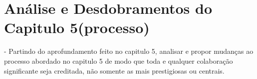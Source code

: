 \chapter{ Análise e Desdobramentos do Capitulo 5(processo)}\label{cap:cap6}

- Partindo do aprofundamento feito no capitulo 5, analisar e propor mudanças ao processo abordado no capitulo 5 de modo que toda e qualquer colaboração significante seja creditada, não somente as mais prestigiosas ou centrais.